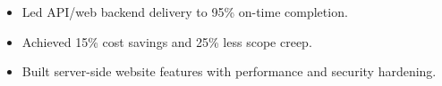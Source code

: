 \vspace{4pt}
\begin{itemize}
  \item Led API/web backend delivery to 95\% on-time completion.
  \item Achieved 15\% cost savings and 25\% less scope creep.
\end{itemize}
\vspace{4pt}
\begin{itemize}
  \item Built server-side website features with performance and security hardening.
\end{itemize}
